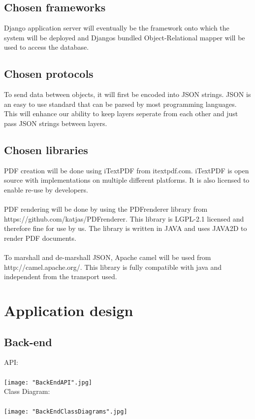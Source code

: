 \documentclass[12pt,a4paper]{article}
\begin{document}
\subsection{Chosen frameworks}
Django application server will eventually be the framework onto which the system will be deployed and Djangos bundled Object-Relational mapper will be used to access the database.
\subsection{Chosen protocols}To send data between objects, it will first be encoded into JSON strings. JSON is an easy to use standard that can be parsed by most programming languages. This will enhance our ability to keep layers seperate from each other and just pass JSON strings between layers.
\subsection{Chosen libraries}
PDF creation will be done using iTextPDF from itextpdf.com. iTextPDF is open source with implementations on multiple different platforms. It is also licensed to enable re-use by developers.\\\\
PDF rendering will be done by using the PDFrenderer library from \\https://github.com/katjas/PDFrenderer. This library is LGPL-2.1 licensed and therefore fine for use by us. The library is written in JAVA and uses JAVA2D to render PDF documents.\\\\
To marshall and de-marshall JSON, Apache camel will be used from \\http://camel.apache.org/. This library is fully compatible with java and independent from the transport used.

\section{Application design}
\subsection{Back-end}
API:\\\\
\texttt{[image: "BackEndAPI".jpg]}
\pagebreak \\
Class Diagram:\\\\
\texttt{[image: "BackEndClassDiagrams".jpg]}
\end{document}
